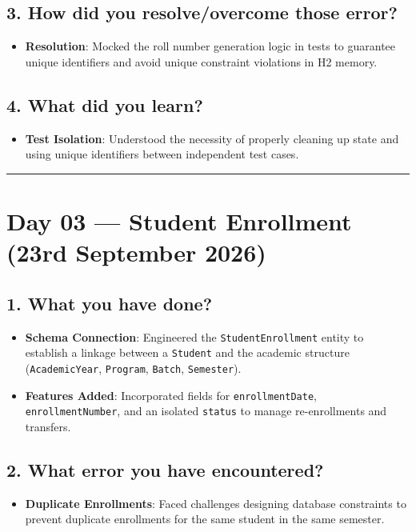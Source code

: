 \documentclass[12pt]{article}
\begin{document}
\subsection*{3. How did you resolve/overcome those error?}
\begin{itemize}
    \item \textbf{Resolution}: Mocked the roll number generation logic in tests to guarantee unique identifiers and avoid unique constraint violations in H2 memory.
\end{itemize}

\subsection*{4. What did you learn?}
\begin{itemize}
    \item \textbf{Test Isolation}: Understood the necessity of properly cleaning up state and using unique identifiers between independent test cases.
\end{itemize}

\vspace{0.5cm}
\hrule
\vspace{0.5cm}

\section*{Day 03 --- Student Enrollment (23rd September 2026)}

\subsection*{1. What you have done?}
\begin{itemize}
    \item \textbf{Schema Connection}: Engineered the \texttt{StudentEnrollment} entity to establish a linkage between a \texttt{Student} and the academic structure (\texttt{AcademicYear}, \texttt{Program}, \texttt{Batch}, \texttt{Semester}).
    \item \textbf{Features Added}: Incorporated fields for \texttt{enrollmentDate}, \texttt{enrollmentNumber}, and an isolated \texttt{status} to manage re-enrollments and transfers.
\end{itemize}

\subsection*{2. What error you have encountered?}
\begin{itemize}
    \item \textbf{Duplicate Enrollments}: Faced challenges designing database constraints to prevent duplicate enrollments for the same student in the same semester.
\end{itemize}
\end{document}
